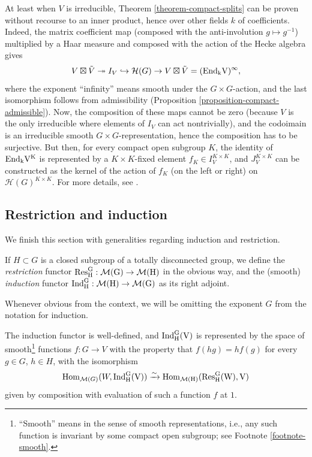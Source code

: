 \begin{remark}
	\label{remark-rationality-Hecke}
	At least when $V$ is irreducible, Theorem \ref{theorem-compact-splits} can be proven without recourse to an inner product, hence over other fields $k$ of coefficients. Indeed, the matrix coefficient map (composed with the anti-involution $g\mapsto g^{-1}$) multiplied by a Haar measure and composed with the action of the Hecke algebra gives
	\[V\boxtimes\tilde V\twoheadrightarrow I_V \hookrightarrow \mathcal H(G)\to V\boxtimes\tilde V = (\rm{End}_k V)^\infty,\]
	where the exponent ``infinity'' means smooth under the $G\times G$-action, and the last isomorphism follows from admissibility (Proposition \ref{proposition-compact-admissible}). Now, the composition of these maps cannot be zero (because $V$ is the only irreducible where elements of $I_V$ can act nontrivially), and the codoimain is an irreducible smooth $G\times G$-representation, hence the composition has to be surjective. But then, for every compact open subgroup $K$, the identity of $\rm{End}_k V^K$ is represented by a $K\times K$-fixed element $f_K\in I_V^{K\times K}$, and $J_V^{K\times K}$ can be constructed as the kernel of the action of $f_K$ (on the left or right) on $\mathcal H(G)^{K\times K}$. For more details, see \cite[I.5]{Bernstein-padic}.
\end{remark}

\subsection{Restriction and induction}
\label{subsection-restriction-induction}

We finish this section with generalities regarding induction and restriction.

\begin{definition}
	\label{definition-restriction-induction}
If $H\subset G$ is a closed subgroup of a totally disconnected group, we define the {\it restriction} functor $\rm{Res}^G_H:\mathcal M(G)\to \mathcal M(H)$ in the obvious way, and the (smooth) {\it induction} functor $\rm{Ind}_H^G:\mathcal M(H)\to \mathcal M(G)$ as its right adjoint.
\end{definition}	

Whenever obvious from the context, we will be omitting the exponent $G$ from the notation for induction.

\begin{proposition}
    \label{proposition-induction-exists}
The induction functor is well-defined, and $\rm{Ind}_H^G(V)$ is represented by the space of smooth\footnote{``Smooth'' means in the sense of smooth representations, i.e., any such function is invariant by some compact open subgroup; see Footnote \ref{footnote-smooth}.} functions $f:G\to V$ with the property that $f(hg) = hf(g)$ for every $g\in G$, $h\in H$, with the isomorphism
$$ \mathop{\rm Hom}\nolimits_{\mathcal M(G)} (W,\rm{Ind}_H^G(V)) \xrightarrow{\sim}  \mathop{\rm Hom}\nolimits_{\mathcal M(H)} (\rm{Res}_H^G(W),V)$$
given by composition with evaluation of such a function $f$ at $1$.
\end{proposition}

